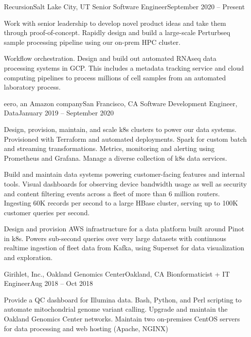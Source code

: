 \resumeSubheading
{Recursion}{Salt Lake City, UT}
{Senior Software Engineer}{September 2020 -- Present}

\resumeItemListStart

{Work with senior leadership to develop novel product ideas and take them through proof-of-concept. Rapidly design and build a large-scale Perturbseq sample processing pipeline using our on-prem HPC cluster.}

{Workflow orchestration. Design and build out automated RNAseq data processing systems in GCP. This includes a metadata tracking service and cloud computing pipelines to process millions of cell samples from an automated laboratory process.}

\resumeItemListEnd

\resumeSubheading
{eero, an Amazon company}{San Francisco, CA}
{Software Development Engineer, Data}{January 2019 -- September 2020}

\resumeItemListStart

{Design, provision, maintain, and scale k8s clusters to power our data systems. Provisioned with Terraform and automated deployments. Spark for custom batch and streaming transformations. Metrics, monitoring and alerting using Prometheus and Grafana. Manage a diverse collection of k8s data services.}

{Build and maintain data systems powering customer-facing features and internal tools. Visual dashboards for observing device bandwidth usage as well as security and content filtering events across a fleet of more than 6 million routers. Ingesting 60K records per second to a large HBase cluster, serving up to 100K customer queries per second.}

{Design and provision AWS infrastructure for a data platform built around Pinot in k8s. Powers sub-second queries over very large datasets with continuous realtime ingestion of fleet data from Kafka, using Superset for data visualization and exploration.}

\resumeItemListEnd

\resumeSubheading
{Girihlet, Inc., Oakland Genomics Center}{Oakland, CA}
{Bionformaticist + IT Engineer}{Aug 2018 -- Oct 2018}

\resumeItemListStart

{Provide a QC dashboard for Illumina data. Bash, Python, and Perl scripting to automate mitochondrial genome variant calling. Upgrade and maintain the Oakland Genomics Center networks. Maintain two on-premises CentOS servers for data processing and web hosting (Apache, NGINX)}

